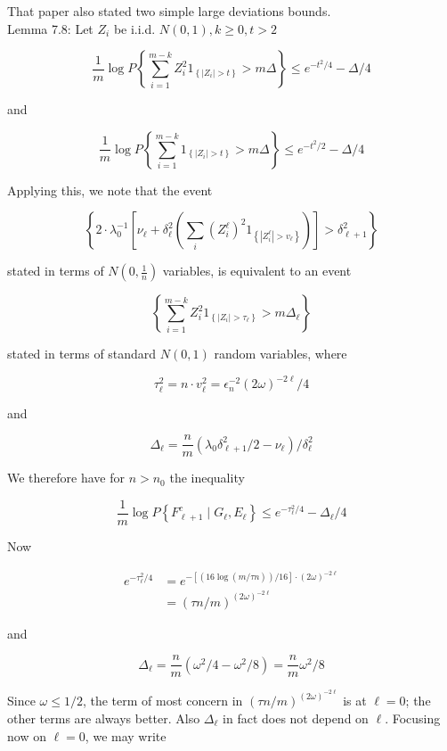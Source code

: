 \documentclass[10pt]{article}
\begin{document}
That paper also stated two simple large deviations bounds.\\
Lemma 7.8: Let $Z_{i}$ be i.i.d. $N(0,1), k \geq 0, t>2$

$$
\frac{1}{m} \log P\left\{\sum_{i=1}^{m-k} Z_{i}^{2} 1_{\left\{\left|Z_{i}\right|>t\right\}}>m \Delta\right\} \leq e^{-t^{2} / 4}-\Delta / 4
$$

and

$$
\frac{1}{m} \log P\left\{\sum_{i=1}^{m-k} 1_{\left\{\left|Z_{i}\right|>t\right\}}>m \Delta\right\} \leq e^{-t^{2} / 2}-\Delta / 4
$$

Applying this, we note that the event

$$
\left\{2 \cdot \lambda_{0}^{-1}\left[\nu_{\ell}+\delta_{\ell}^{2}\left(\sum_{i}\left(Z_{i}^{\ell}\right)^{2} 1_{\left\{\left|Z_{i}^{\ell}\right|>v_{\ell}\right\}}\right)\right]>\delta_{\ell+1}^{2}\right\}
$$

stated in terms of $N\left(0, \frac{1}{n}\right)$ variables, is equivalent to an event

$$
\left\{\sum_{i=1}^{m-k} Z_{i}^{2} 1_{\left\{\left|Z_{i}\right|>\tau_{\ell}\right\}}>m \Delta_{\ell}\right\}
$$

stated in terms of standard $N(0,1)$ random variables, where

$$
\tau_{\ell}^{2}=n \cdot v_{\ell}^{2}=\epsilon_{n}^{-2}(2 \omega)^{-2 \ell} / 4
$$

and

$$
\Delta_{\ell}=\frac{n}{m}\left(\lambda_{0} \delta_{\ell+1}^{2} / 2-\nu_{\ell}\right) / \delta_{\ell}^{2}
$$

We therefore have for $n>n_{0}$ the inequality

$$
\frac{1}{m} \log P\left\{F_{\ell+1}^{c} \mid G_{\ell}, E_{\ell}\right\} \leq e^{-\tau_{\ell}^{2} / 4}-\Delta_{\ell} / 4
$$

Now

$$
\begin{aligned}
e^{-\tau_{\ell}^{2} / 4} & =e^{-[(16 \log (m / \tau n)) / 16] \cdot(2 \omega)^{-2 \ell}} \\
& =(\tau n / m)^{(2 \omega)^{-2 \ell}}
\end{aligned}
$$

and

$$
\Delta_{\ell}=\frac{n}{m}\left(\omega^{2} / 4-\omega^{2} / 8\right)=\frac{n}{m} \omega^{2} / 8
$$

Since $\omega \leq 1 / 2$, the term of most concern in $(\tau n / m)^{(2 \omega)^{-2 \ell}}$ is at $\ell=0$; the other terms are always better. Also $\Delta_{\ell}$ in fact does not depend on $\ell$. Focusing now on $\ell=0$, we may write
\end{document}

